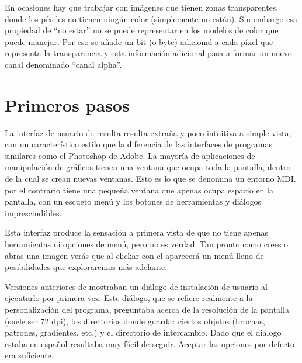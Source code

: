 En  ocasiones  hay   que  trabajar  con  imágenes   que  tienen  zonas
transparentes, donde los píxeles no tienen ningún color (simplemente
no están). Sin embargo esa  propiedad de ``no estar'' no se
puede representar en los modelos de color que \gimp puede manejar. Por
eso  se añade  un bit  (o byte)  adicional a  cada píxel  que representa  la
transparencia  y esta  información adicional  pasa a  formar un  nuevo
canal  denominado ``canal  alpha''.




\section{Primeros pasos}

La interfaz de usuario de \gimp resulta resulta extraña y poco intuitiva
a simple vista, con un  característico estilo que
la  diferencia  de  las  interfaces de  programas  similares  como  el
Photoshop  de Adobe.  La mayoría  de aplicaciones  de manipulación  de
gráficos tienen una  ventana que ocupa toda la pantalla,  dentro de la
cual se crean  nuevas ventanas. Esto es lo que  se denomina un entorno
MDI. \gimp por el contrario tiene una pequeña ventana que apenas ocupa
espacio  en  la  pantalla,  con  un escueto  menú  y  los  botones  de
herramientas y diálogos imprescindibles.

Esta interfaz  produce la sensación  a primera  vista de que  \gimp no
tiene apenas herramientas ni opciones de  menú, pero no es verdad. Tan
pronto  como crees  o abras  una imagen  verás que  al clickar  con el
\bdr aparecerá  un menú  lleno de  posibilidades que  exploraremos más
adelante.

Versiones anteriores de \gimp
mostraban un diálogo de  instalación de usuario al ejecutarlo por primera vez.
Este diálogo, que se refiere realmente a la personalización del programa,
preguntaba acerca de la resolución de la pantalla (suele ser 72 dpi),
los  directorios donde  guardar  ciertos objetos (brochas,  patrones,
gradientes, etc.) y  el directorio de intercambio. Dado  que el diálogo
estaba en español resultaba muy fácil de seguir. Aceptar las opciones
por defecto era suficiente.

